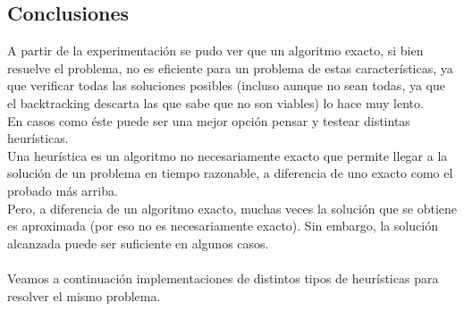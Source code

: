 \subsection{Conclusiones}

A partir de la experimentaci\'on se pudo ver que un algoritmo exacto, si bien resuelve el problema, no es eficiente para un problema de estas caracter\'isticas, ya que verificar todas las soluciones posibles (incluso aunque no sean todas, ya que el backtracking descarta las que sabe que no son viables) lo hace muy lento.\\
En casos como \'este puede ser una mejor opci\'on pensar y testear distintas heur\'isticas.\\

Una heur\'istica es un algoritmo no necesariamente exacto que permite llegar a la soluci\'on de un problema en tiempo razonable, a diferencia de uno exacto como el probado m\'as arriba.\\
Pero, a diferencia de un algoritmo exacto, muchas veces la soluci\'on que se obtiene es aproximada (por eso no es necesariamente exacto). Sin embargo, la soluci\'on alcanzada puede ser suficiente en algunos casos.\\\\

Veamos a continuaci\'on implementaciones de distintos tipos de heur\'isticas para resolver el mismo problema.\\
